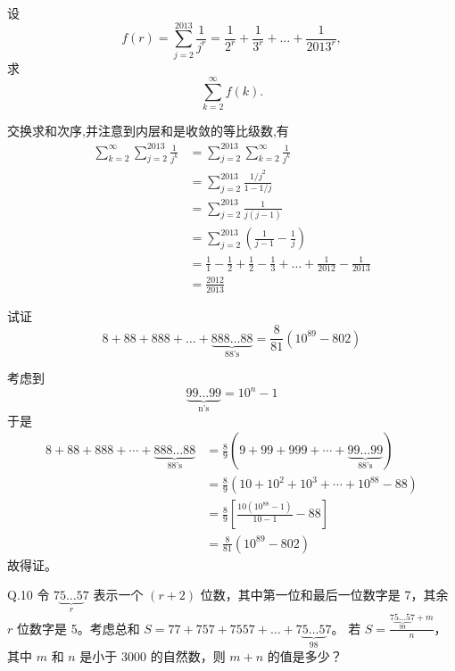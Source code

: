 \begin{questions}
    \question 设
    \[
    f(r)=\sum_{j=2}^{2013}\frac{1}{j^r}
    =\frac{1}{2^r}+\frac{1}{3^r}+\dots+\frac{1}{2013^r},
    \]
    求
    \[
    \sum_{k=2}^{\infty} f(k).
    \]
    \begin{solution}
        交换求和次序,并注意到内层和是收敛的等比级数,有
        \begin{align*}
        \sum_{k=2}^{\infty}\sum_{j=2}^{2013}\frac{1}{j^k}
        &=\sum_{j=2}^{2013}\sum_{k=2}^{\infty}\frac{1}{j^k}\\
        &=\sum_{j=2}^{2013}\frac{1/j^2}{1-1/j}\\
        &=\sum_{j=2}^{2013}\frac{1}{j(j-1)}\\
        &=\sum_{j=2}^{2013}\left(\frac{1}{j-1}-\frac{1}{j}\right)\\
        &=\frac{1}{1}-\frac{1}{2}+\frac{1}{2}-\frac{1}{3}+\dots+\frac{1}{2012}-\frac{1}{2013}\\
        &=\frac{2012}{2013}
        \end{align*}
    \end{solution}

    \question 试证 
    \[
    8 + 88 + 888 + \ldots + \underbrace{888\ldots88}_{\text{88's}} = \frac{8}{81}(10^{89} - 802)
    \] 
    \begin{solution}
        考虑到
        \[
        \underbrace{99\ldots99}_{\text{n's}}= 10^n - 1
        \]
        于是
        \begin{align*}
        8 + 88 + 888 + \cdots + \underbrace{888\ldots88}_{\text{88's}} 
        &= \frac{8}{9}(9 + 99 + 999 + \cdots + \underbrace{99\ldots99}_{\text{88's}}) \\
        &= \frac{8}{9}(10 + 10^2 + 10^3 + \cdots + 10^{88} - 88) \\
        &= \frac{8}{9}\left[\frac{10(10^{88}-1)}{10-1}-88\right] \\
        &= \frac{8}{81}(10^{89} - 802)
        \end{align*}
        故得证。
    \end{solution}

    \question
Q.10 令 $7\underbrace{5 \dots 5}_{r}7$ 表示一个 $(r+2)$ 位数，其中第一位和最后一位数字是 7，其余 $r$ 位数字是 5。考虑总和 $S = 77 + 757 + 7557 + \dots + 7\underbrace{5 \dots 5}_{98}7$。
若 $S = \frac{7\underbrace{5 \dots 5}_{99}7 + m}{n}$，其中 $m$ 和 $n$ 是小于 3000 的自然数，则 $m+n$ 的值是多少？


\end{questions}
